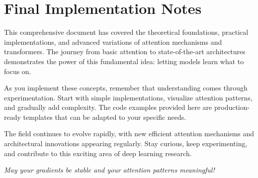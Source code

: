 \documentclass[11pt]{article}
\begin{document}
\section{Final Implementation Notes}

This comprehensive document has covered the theoretical foundations, practical implementations, and advanced variations of attention mechanisms and transformers. The journey from basic attention to state-of-the-art architectures demonstrates the power of this fundamental idea: letting models learn what to focus on.

As you implement these concepts, remember that understanding comes through experimentation. Start with simple implementations, visualize attention patterns, and gradually add complexity. The code examples provided here are production-ready templates that can be adapted to your specific needs.

The field continues to evolve rapidly, with new efficient attention mechanisms and architectural innovations appearing regularly. Stay curious, keep experimenting, and contribute to this exciting area of deep learning research.

\textit{May your gradients be stable and your attention patterns meaningful!}

\end{document}
